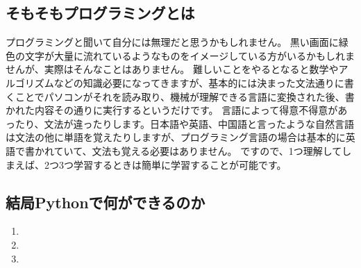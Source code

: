 \documentclass[10pt,b5paper,papersize,dvipdfmx]{jsbook}
\begin{document}
\subsection{そもそもプログラミングとは}
プログラミングと聞いて自分には無理だと思うかもしれません。
黒い画面に緑色の文字が大量に流れているようなものをイメージしている方がいるかもしれませんが、実際はそんなことはありません。
難しいことをやるとなると数学やアルゴリズムなどの知識必要になってきますが、基本的には決まった文法通りに書くことでパソコンがそれを読み取り、機械が理解できる言語に変換された後、書かれた内容その通りに実行するというだけです。
言語によって得意不得意があったり、文法が違ったりします。日本語や英語、中国語と言ったような自然言語は文法の他に単語を覚えたりしますが、プログラミング言語の場合は基本的に英語で書かれていて、文法も覚える必要はありません。
ですので、1つ理解してしまえば、2つ3つ学習するときは簡単に学習することが可能です。\par
\subsection{結局Pythonで何ができるのか}

\begin{sanko}
  \begin{enumerate}
    \item 
    \item 
    \item 
  \end{enumerate}
\end{sanko}
\end{document}
